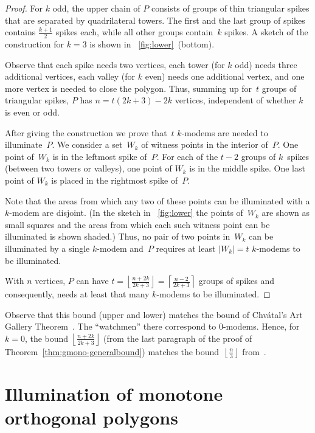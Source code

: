 \documentclass[A4]{article}
\begin{document}
\begin{proof}
For $k$ odd, the upper chain of $P$ consists of groups of thin triangular spikes that are separated by quadrilateral towers. 
The first and the last group of spikes contains $\frac{k+1}{2}$ spikes each, while all other groups contain~$k$ spikes. 
A sketch of the construction for $k=3$ is shown in \figurename~\ref{fig:lower}~(bottom).


Observe that each spike needs two vertices, each tower (for $k$ odd) needs three additional vertices, each valley (for $k$ even) needs one additional vertex, and one more vertex is needed to close the polygon. 
Thus, summing up for~$t$ groups of triangular spikes, $P$ has $n=t(2k+3) - 2k$ vertices, independent of whether $k$ is even or odd.



After giving the construction we prove that~$t$ \mbox{$k$-modems} are needed to illuminate~$P$.
We consider a set~$W_k$ of witness points in the interior of~$P$.
One point of~$W_k$ is in the leftmost spike of~$P$.
For each of the \mbox{$t\!-\!2$} groups of $k$~spikes (between two towers or valleys), one point of $W_k$ is in the middle spike.
One last point of $W_k$ is placed in the rightmost spike of~$P$.

Note that the areas from which any two of these points can be illuminated with a \mbox{$k$-modem} are disjoint.
(In the sketch in \figurename~\ref{fig:lower} the points of~$W_k$ are shown as small squares and the areas from which each such witness point can be illuminated is shown shaded.)
Thus, no pair of two points in~$W_k$ can be illuminated by a single \mbox{$k$-modem} and~$P$ requires at least $|W_k|=t$ \mbox{$k$-modems} to be illuminated. 

With $n$ vertices, $P$ can have $t = \left\lfloor \frac{n+2k}{2k+3} \right\rfloor = \left\lceil \frac{n-2}{2k+3} \right\rceil$ groups of spikes and consequently, needs at least that many \mbox{$k$-modems} to be illuminated. \end{proof}


Observe that this bound (upper and lower) matches the bound of Chv\'atal's Art Gallery Theorem~\cite{Chvatal}.
The ``watchmen'' there correspond to \mbox{$0$-modems}.
Hence, for $k=0$, the bound $\left\lfloor \frac{n+2k}{2k+3} \right\rfloor$ (from the last paragraph of the proof of Theorem~\ref{thm:gmono-generalbound}) matches the bound~$\left\lfloor\frac{n}{3}\right\rfloor$ from~\cite{Chvatal}.




\section{Illumination of monotone orthogonal polygons}\label{sec:monoortho}
\end{document}
